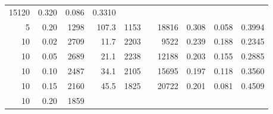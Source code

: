 \begin{table}[!htb]
\begin{tabular}{r r r r r c r r r r}
    15120                                     & 0.320
                                              & 0.086                          &
    0.3310
    \\
    5                                         & 0.20
                                              & 1298                           &
    107.3                                     & 1153
                                              &                                &
    18816                                     & 0.308
                                              & 0.058                          &
    0.3994
    \\
    \midrule
    10                                        & 0.02
                                              & 2709                           &
    11.7                                      & 2203
                                              &                                &
    9522                                      & 0.239
                                              & 0.188                          &
    0.2345
    \\
    10                                        & 0.05
                                              & 2689                           &
    21.1                                      & 2238
                                              &                                &
    12188                                     & 0.203
                                              & 0.155                          &
    0.2885
    \\
    10                                        & 0.10
                                              & 2487                           &
    34.1                                      & 2105
                                              &                                &
    15695                                     & 0.197
                                              & 0.118                          &
    0.3560
    \\
    10                                        & 0.15
                                              & 2160                           &
    45.5                                      & 1825
                                              &                                &
    20722                                     & 0.201
                                              & 0.081                          &
    0.4509
    \\
    10                                        & 0.20
                                              & 1859                           &

\end{tabular}
\end{table}
